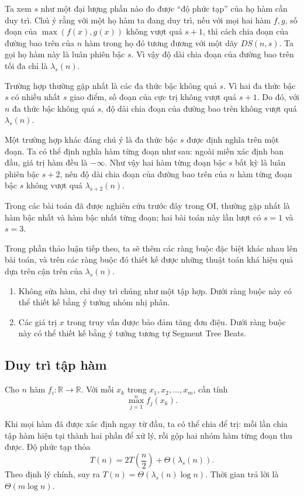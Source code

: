 \documentclass[11pt]{article}
\begin{document}
Ta xem \(s\) như một đại lượng phần nào đo được ``độ phức tạp'' của họ hàm cần
duy trì. Chú ý rằng với một họ hàm ta đang duy trì, nếu với mọi hai hàm \(f,g\),
số đoạn của \(\max(f(x),g(x))\) không vượt quá \(s+1\), thì cách chia đoạn của
đường bao trên của \(n\) hàm trong họ đó tương đương với một dãy \(DS(n,s)\). Ta
gọi họ hàm này là luân phiên bậc \(s\). Vì vậy độ dài chia đoạn của đường bao
trên tối đa chỉ là \(\lambda_s(n)\).

Trường hợp thường gặp nhất là các đa thức bậc không quá \(s\). Vì hai đa thức
bậc \(s\) có nhiều nhất \(s\) giao điểm, số đoạn của cực trị không vượt quá
\(s+1\). Do đó, với \(n\) đa thức bậc không quá \(s\), độ dài chia đoạn của
đường bao trên không vượt quá \(\lambda_s(n)\).

Một trường hợp khác đáng chú ý là đa thức bậc \(s\) được định nghĩa trên một
đoạn. Ta có thể định nghĩa hàm từng đoạn như sau: ngoài miền xác định ban đầu,
giá trị hàm đều là \(-\infty\). Như vậy hai hàm từng đoạn bậc \(s\) bất kỳ là
luân phiên bậc \(s+2\), nên độ dài chia đoạn của đường bao trên của \(n\) hàm
từng đoạn bậc \(s\) không vượt quá \(\lambda_{s+2}(n)\).

Trong các bài toán đã được nghiên cứu trước đây trong OI, thường gặp nhất là
hàm bậc nhất và hàm bậc nhất từng đoạn; hai bài toán này lần lượt có \(s=1\) và
\(s=3\).

Trong phần thảo luận tiếp theo, ta sẽ thêm các ràng buộc đặc biệt khác nhau lên
bài toán, và trên các ràng buộc đó thiết kế được những thuật toán khá hiệu quả
dựa trên cận trên của \(\lambda_s(n)\).

\begin{enumerate}
  \item Không sửa hàm, chỉ duy trì chúng như một tập hợp. Dưới ràng buộc này có
  thể thiết kế bằng ý tưởng nhóm nhị phân.
  \item Các giá trị \(x\) trong truy vấn được bảo đảm tăng đơn điệu. Dưới ràng
  buộc này có thể thiết kế bằng ý tưởng tương tự Segment Tree Beats.
\end{enumerate}

\subsection{Duy trì tập hàm}

Cho \(n\) hàm \(f_i:\mathbb{R}\to\mathbb{R}\). Với mỗi
\(x_k\) trong \(x_1,x_2,\ldots,x_m\), cần tính
\[
  \max_{j=1}^n f_j(x_k).
\]

Khi mọi hàm đã được xác định ngay từ đầu, ta có thể chia để trị: mỗi lần chia
tập hàm hiện tại thành hai phần để xử lý, rồi gộp hai nhóm hàm từng đoạn thu
được. Độ phức tạp thỏa
\[
  T(n)=2T\left(\frac n2\right)+\Theta(\lambda_s(n)).
\]
Theo định lý chính, suy ra \(T(n)=\Theta(\lambda_s(n)\log n)\). Thời gian trả
lời là \(\Theta(m\log n)\).
\end{document}
